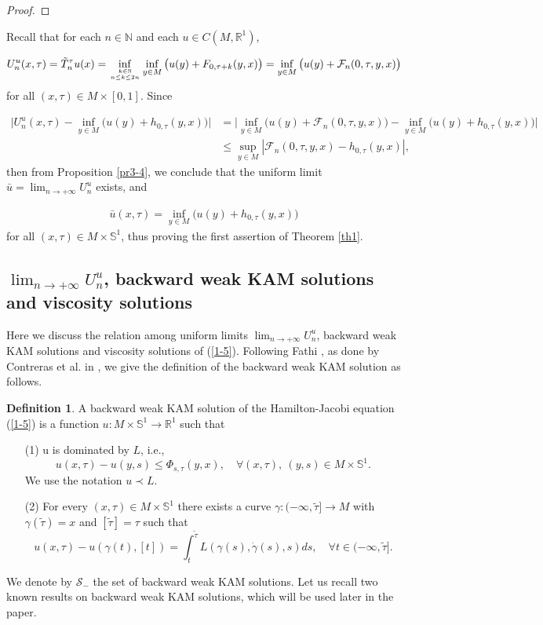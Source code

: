 \documentclass{amsart}[12pt]
\theoremstyle{definition}
\newtheorem{definition}[theorem]{Definition}
\theoremstyle{remark}
\numberwithin{equation}{section}
\begin{document}
\begin{proof}
\end{proof}

Recall that for each $n\in\mathbb{N}$ and each $u\in
C(M,\mathbb{R}^1)$,

\[
U^u_n(x,\tau)=\tilde{T}_n^\tau u(x)=\inf_{k\in\mathbb{N} \atop
n\leq k\leq 2n}\inf_{y\in
M}\big(u(y)+F_{0,\tau+k}(y,x)\big)=\inf_{y\in
M}\big(u(y)+\mathcal{F}_n(0,\tau,y,x)\big)
\]
for all $(x,\tau)\in M\times[0,1]$. Since

\begin{align*}
\big|U^u_n(x,\tau)-\inf_{y\in
M}\big(u(y)+h_{0,\tau}(y,x)\big)\big|&= \big|\inf_{y\in
M}\big(u(y)+\mathcal{F}_n(0,\tau,y,x)\big)-\inf_{y\in
M}\big(u(y)+h_{0,\tau}(y,x)\big)\big|\\
& \leq \sup_{y\in M}|\mathcal{F}_n(0,\tau,y,x)-h_{0,\tau}(y,x)|,
\end{align*}
then from Proposition \ref{pr3-4}, we conclude that the uniform
limit $\bar{u}=\lim_{n\to+\infty}U^u_n$ exists, and

\begin{align}\label{3-18}
\bar{u}(x,\tau)=\inf_{y\in M}\big(u(y)+h_{0,\tau}(y,x)\big)
\end{align}
for all $(x,\tau)\in M\times\mathbb{S}^1$, thus proving the first
assertion of Theorem \ref{th1}.

\subsection{$\lim_{n\to+\infty}U_n^u$, backward weak KAM solutions and viscosity solutions}
Here we discuss the relation among uniform limits
$\lim_{n\to+\infty}U^u_n$, backward weak KAM solutions and
viscosity solutions of (\ref{1-5}). Following Fathi \cite{Fat1},
as done by Contreras et al. in \cite{Con}, we give the definition
of the backward weak KAM solution as follows.

\begin{definition}\label{def3}
A backward weak KAM solution of the Hamilton-Jacobi equation
(\ref{1-5}) is a function $u:M\times\mathbb{S}^1\to\mathbb{R}^1$
such that
\begin{itemize}
    \item [(1)] u is dominated by $L$, i.e.,
               \[
               u(x,\tau)-u(y,s)\leq\Phi_{s,\tau}(y,x), \quad
               \forall (x,\tau),\ (y,s)\in M\times\mathbb{S}^1.
               \]
               We use the notation $u\prec L$.
    \item [(2)] For every $(x,\tau)\in M\times\mathbb{S}^1$ there
               exists a curve $\gamma:(-\infty,\tilde{\tau}]\to M$ with
               $\gamma(\tilde{\tau})=x$ and $[\tilde{\tau}]=\tau$ such that
               \[
               u(x,\tau)-u(\gamma(t),[t])=\int_t^{\tilde{\tau}}L(\gamma(s),\dot{\gamma}(s),s)ds,\quad
               \forall t\in(-\infty,\tilde{\tau}].
               \]
\end{itemize}
\end{definition}
\noindent We denote by $\mathcal{S}_-$ the set of backward weak
KAM solutions. Let us recall two known results \cite{Con} on
backward weak KAM solutions, which will be used later in the
paper.
\end{document}
